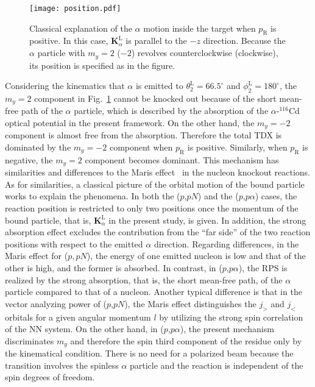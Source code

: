 \documentclass[%
 reprint,
superscriptaddress,
 amsmath,amssymb,
 aps,
]{revtex4-2}
\begin{document}
\begin{figure}[h]
  \centering
  \texttt{[image: position.pdf]}
  \caption{
   Classical explanation of the $\alpha$ motion inside the target 
   when $p_\mathrm{R}$ is positive. 
   In this case, $\bm{K}^\mathrm{L}_\alpha$ is parallel to the $-z$ direction. 
   Because the $\alpha$ particle with $m_y=2$ ($-2$) revolves counterclockwise 
   (clockwise), its position is specified as in the figure.
  }
  \label{fig:classical}
\end{figure}
Considering the kinematics that
$\alpha$ is emitted to $\theta_2^\mathrm{L} = 66.5^\circ$ and $\phi_2^\mathrm{L} = 180^\circ$, 
the $m_y = 2$ component in Fig.~\ref{fig:classical} cannot be knocked out because
of the short mean-free path of the $\alpha$ particle, which is described  
by the absorption of the $\alpha$-$^{116}$Cd optical potential
in the present framework.
On the other hand, the $m_y = -2$ component is almost free from the absorption.
Therefore the total TDX is dominated by the $m_y = -2$ component when $p_\mathrm{R}$ is
positive.  Similarly, when $p_\mathrm{R}$ is negative, the $m_y=2$ component becomes dominant.
This mechanism has similarities and differences to 
the Maris effect~\cite{Maris58,Jacob76,Maris79,Krein95} 
in the nucleon knockout reactions.
As for similarities, a classical picture of the orbital motion of the bound particle works to explain the phenomena. 
In both the ($p$,$pN$) and the ($p$,$p\alpha$) cases, the reaction position is restricted to only two positions once the momentum of the bound particle, that is, $\bm{K}_{\alpha}^{\mathrm{L}}$ in the present study, is given.
In addition, the strong absorption effect excludes the contribution from the ``far side'' of the two reaction positions with respect to the emitted $\alpha$ direction.
Regarding differences, 
in the Maris effect for ($p,pN$), the energy of one emitted nucleon is low and that of the other is high, and the former is absorbed. 
In contrast, in ($p$,$p\alpha$), the RPS is realized by the strong absorption, that is, the short mean-free path, of the $\alpha$ particle compared to that of a nucleon.
Another typical difference is that in the vector analyzing power of ($p$,$pN$), the Maris effect distinguishes the $j_{>}$ and $j_{<}$ orbitals for a given angular momentum $l$ by utilizing the strong spin correlation of the NN system.
On the other hand, in ($p$,$p\alpha$), the present mechanism discriminates $m_y$ and therefore the spin third component of the residue only by the kinematical condition.
There is no need for a polarized beam because the transition involves the spinless $\alpha$ particle and the reaction is independent of the spin degrees of freedom. 
\end{document}
